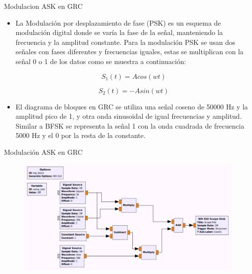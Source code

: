 \begin{frame}{Modulacion ASK en GRC}

  \begin{itemize}
  \item {
La Modulación por desplazamiento de fase (PSK) es un esquema de modulación digital donde se varía la fase de la señal, manteniendo la frecuencia y la amplitud constante. Para la modulación PSK se usan dos señales con fases diferentes y frecuencias iguales, estas se multiplican con la señal 0 o 1 de los datos como se muestra a continuación:

\begin{equation*}
S_{1}(t) = Acos(wt)
\end{equation*}

\begin{equation*}
S_{2}(t) = -Asin(wt)
\end{equation*}

  }
  \item {
El diagrama de bloques en GRC se utiliza una señal coseno de 50000 Hz y la amplitud pico de 1, y otra onda sinusoidal de igual frecuencias y amplitud. Similar a BFSK se representa la señal 1 con la onda cuadrada de frecuencia 5000 Hz y el 0 por la resta de la constante\cite{Conferencia2015}. 
  }
  \end{itemize}
\end{frame}

\begin{frame}{Modulación ASK en GRC}
\begin{figure}[H]
\centering
\includegraphics[width=\textwidth]{parte1/lab4/pdf/lab4_7.pdf}
\end{figure}
\end{frame}

